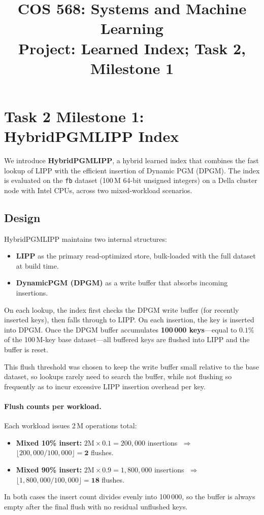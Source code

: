 \documentclass[11pt]{article}
\title{COS 568: Systems and Machine Learning \\ \Large Project: Learned Index; Task 2, Milestone 1}
\author{}
\date{}
\begin{document}
\maketitle

\section*{Task 2 Milestone 1: HybridPGMLIPP Index}

We introduce \textbf{HybridPGMLIPP}, a hybrid learned index that combines the fast lookup of
LIPP with the efficient insertion of Dynamic PGM (DPGM).
The index is evaluated on the \texttt{fb} dataset (100\,M 64-bit unsigned integers)
on a Della cluster node with Intel CPUs, across two mixed-workload scenarios.

\subsection*{Design}

HybridPGMLIPP maintains two internal structures:
\begin{itemize}
    \item \textbf{LIPP} as the primary read-optimized store, bulk-loaded with the full dataset at build time.
    \item \textbf{DynamicPGM (DPGM)} as a write buffer that absorbs incoming insertions.
\end{itemize}

On each lookup, the index first checks the DPGM write buffer (for recently inserted keys),
then falls through to LIPP. On each insertion, the key is inserted into DPGM.
Once the DPGM buffer accumulates \textbf{100\,000 keys}---equal to $0.1\%$ of the
100\,M-key base dataset---all buffered keys are flushed into LIPP and the buffer is reset.

This flush threshold was chosen to keep the write buffer small relative to the base dataset,
so lookups rarely need to search the buffer, while not flushing so frequently as to incur
excessive LIPP insertion overhead per key.

\paragraph{Flush counts per workload.}
Each workload issues 2\,M operations total:
\begin{itemize}
    \item \textbf{Mixed 10\% insert:} $2\text{M} \times 0.1 = 200{,}000$ insertions $\;\Rightarrow\;$
          $\lfloor 200{,}000 / 100{,}000 \rfloor = \mathbf{2}$ flushes.
    \item \textbf{Mixed 90\% insert:} $2\text{M} \times 0.9 = 1{,}800{,}000$ insertions $\;\Rightarrow\;$
          $\lfloor 1{,}800{,}000 / 100{,}000 \rfloor = \mathbf{18}$ flushes.
\end{itemize}
In both cases the insert count divides evenly into 100\,000, so the buffer is always empty after
the final flush with no residual unflushed keys.
\end{document}
